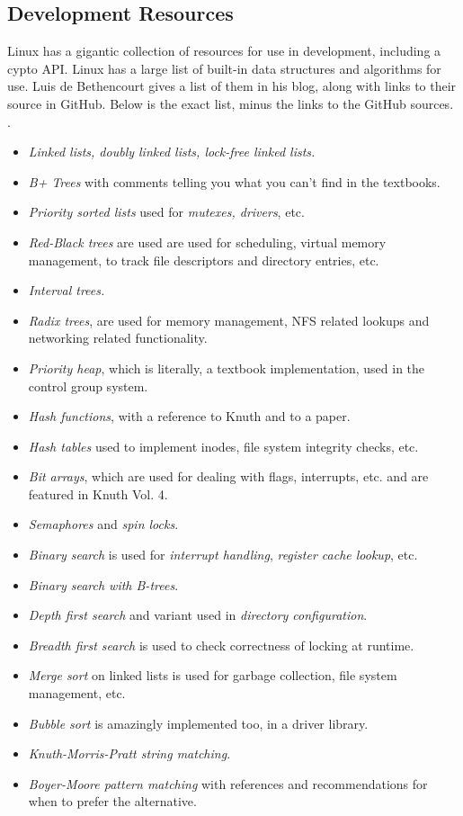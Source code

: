 \documentclass[onecolumn,draftclsnofoot, 10pt, compsoc]{IEEEtran}
\begin{document}
	\subsection{Development Resources}
		Linux has a gigantic collection of resources for use in development, including a cypto API.
		Linux has a large list of built-in data structures and algorithms for use.
		Luis de Bethencourt gives a list of them in his blog, along with links to their source in GitHub.
		Below is the exact list, minus the links to the GitHub sources. \cite{linuxRes}.
		\begin{itemize}
			\item \textit{Linked lists, doubly linked lists, lock-free linked lists.}
			\item \textit{B+ Trees} with comments telling you what you can't find in the textbooks.
			\item \textit{Priority sorted lists} used for \textit{mutexes, drivers}, etc.
			\item \textit{Red-Black trees} are used are used for scheduling, virtual memory management, to track file descriptors and directory entries, etc.
			\item \textit{Interval trees.}
			\item \textit{Radix trees}, are used for memory management, NFS related lookups and networking related functionality.
			\item \textit{Priority heap}, which is literally, a textbook implementation, used in the control group system.
			\item \textit{Hash functions}, with a reference to Knuth and to a paper.
			\item \textit{Hash tables} used to implement inodes, file system integrity checks, etc.
			\item \textit{Bit arrays}, which are used for dealing with flags, interrupts, etc. and are featured in Knuth Vol. 4.
			\item\textit{ Semaphores} and \textit{spin locks}.
			\item \textit{Binary search} is used for\textit{ interrupt handling}, \textit{register cache lookup}, etc.
			\item \textit{Binary search with B-trees}.
			\item \textit{Depth first search} and variant used in \textit{directory configuration}.
			\item \textit{Breadth first search} is used to check correctness of locking at runtime.
			\item\textit{ Merge sort} on linked lists is used for garbage collection, file system management, etc.
			\item \textit{Bubble sort} is amazingly implemented too, in a driver library.
			\item \textit{Knuth-Morris-Pratt string matching}.
			\item \textit{Boyer-Moore pattern matching} with references and recommendations for when to prefer the alternative.
		\end{itemize}
	
\end{document}
